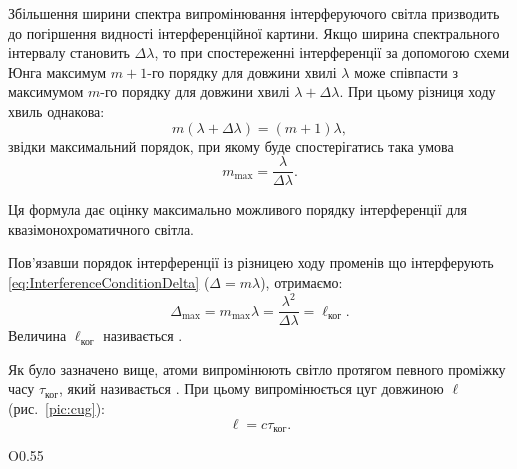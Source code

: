 Збільшення ширини спектра випромінювання інтерферуючого світла
призводить до погіршення видності інтерференційної картини. Якщо
ширина спектрального інтервалу становить $\Delta\lambda$, то при спостереженні інтерференції за допомогою схеми Юнга максимум $m + 1$-го порядку для довжини хвилі $\lambda$ може співпасти з максимумом $m$-го порядку для
довжини хвилі $\lambda + \Delta\lambda$. При цьому різниця ходу хвиль однакова:
\begin{equation}
	m (\lambda + \Delta\lambda) = (m + 1)\lambda,
\end{equation}
звідки максимальний порядок, при якому буде спостерігатись така умова
\begin{equation*}\label{eq:max_interf_resol}
	m_{\max} = \frac{\lambda}{\Delta\lambda} .
\end{equation*}

Ця формула дає оцінку максимально можливого порядку
інтерференції для квазімонохроматичного світла.

Пов'язавши порядок інтерференції із різницею ходу
променів що інтерферують \eqref{eq:InterferenceConditionDelta} ($\Delta = m\lambda $), отримаємо:
\begin{equation}\label{eq:coherence_length}
	\Delta_{\max} =  m_{\max}\lambda = \frac{\lambda^2}{\Delta\lambda}  =  \ell_\text{ког}.
\end{equation}
Величина $ \ell_\text{ког} $ називається .


Як було зазначено вище, атоми випромінюють світло протягом певного проміжку часу $\tau_\text{ког}$, який називається . При цьому випромінюється цуг довжиною $ \ell $ (рис.~\ref{pic:cug}):
\begin{equation}\label{eq:cug_length}
	\ell = c\tau_\text{ког}.
\end{equation}

\begin{wrapfigure}{O}{0.55\linewidth}\centering
\caption{Цуг хвилі}
\label{pic:cug}
\end{wrapfigure}


